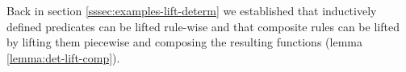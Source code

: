 Back in section \ref{sssec:examples-lift-determ} we established that inductively defined predicates can be lifted rule-wise and that composite rules can be lifted by lifting them piecewise and composing the resulting functions (lemma \ref{lemma:det-lift-comp}).

